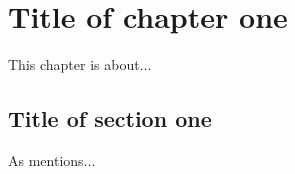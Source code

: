 \chapter{\label{chap:chapter1}Title of chapter one}
This chapter is about...
\section{\label{sec:chapter1:sec1}Title of section one}
As \cite{Author:1989} mentions...